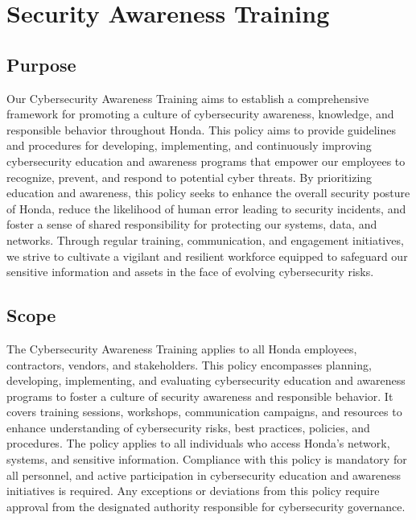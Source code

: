 \chapter{Security Awareness Training}
\pagestyle{fancy}

\fancyhf{}

\fancyfoot[C]{\thepage}

\renewcommand{\headrulewidth}{0pt}
\renewcommand{\footrulewidth}{0pt}

\section{Purpose}
Our Cybersecurity Awareness Training aims to establish a comprehensive framework for promoting a culture of cybersecurity awareness, knowledge, and responsible behavior throughout Honda. This policy aims to provide guidelines and procedures for developing, implementing, and continuously improving cybersecurity education and awareness programs that empower our employees to recognize, prevent, and respond to potential cyber threats. By prioritizing education and awareness, this policy seeks to enhance the overall security posture of Honda, reduce the likelihood of human error leading to security incidents, and foster a sense of shared responsibility for protecting our systems, data, and networks. Through regular training, communication, and engagement initiatives, we strive to cultivate a vigilant and resilient workforce equipped to safeguard our sensitive information and assets in the face of evolving cybersecurity risks.
\section{Scope}
The Cybersecurity Awareness Training applies to all Honda employees, contractors, vendors, and stakeholders. This policy encompasses planning, developing, implementing, and evaluating cybersecurity education and awareness programs to foster a culture of security awareness and responsible behavior. It covers training sessions, workshops, communication campaigns, and resources to enhance understanding of cybersecurity risks, best practices, policies, and procedures. The policy applies to all individuals who access Honda's network, systems, and sensitive information. Compliance with this policy is mandatory for all personnel, and active participation in cybersecurity education and awareness initiatives is required. Any exceptions or deviations from this policy require approval from the designated authority responsible for cybersecurity governance.

